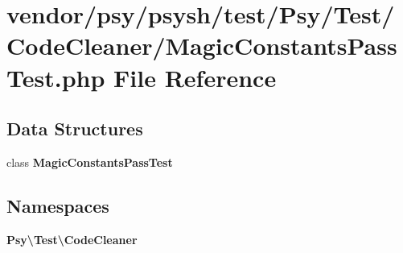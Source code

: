 \section{vendor/psy/psysh/test/\+Psy/\+Test/\+Code\+Cleaner/\+Magic\+Constants\+Pass\+Test.php File Reference}
\label{_magic_constants_pass_test_8php}
\subsection*{Data Structures}
\begin{DoxyCompactItemize}
\item 
class {\bf Magic\+Constants\+Pass\+Test}
\end{DoxyCompactItemize}
\subsection*{Namespaces}
\begin{DoxyCompactItemize}
\item 
 {\bf Psy\textbackslash{}\+Test\textbackslash{}\+Code\+Cleaner}
\end{DoxyCompactItemize}
